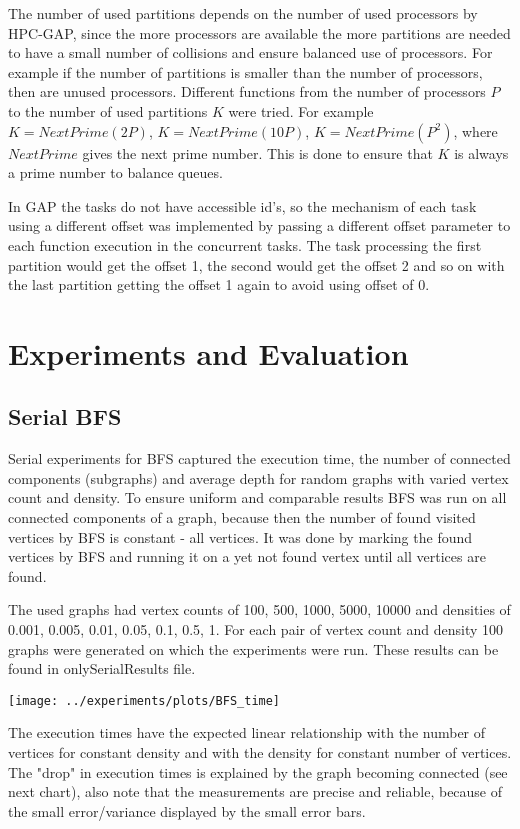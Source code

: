 \documentclass{report}
\theoremstyle{plain}
\theoremstyle{definition}
\theoremstyle{remark}
\begin{document}
The number of used partitions depends on the number of used processors by HPC-GAP, since the more processors are available the more partitions are needed to have a small number of collisions and ensure balanced use of processors. For example if the number of partitions is smaller than the number of processors, then are unused processors. Different functions from the number of processors $P$ to the number of used partitions $K$ were tried. For example $K=NextPrime(2P)$, $K=NextPrime(10P)$, $K=NextPrime(P^2)$, where $NextPrime$ gives the next prime number. This is done to ensure that $K$ is always a prime number to balance queues.

In GAP the tasks do not have accessible id's, so the mechanism of each task using a different offset was implemented by passing a different offset parameter to each function execution in the concurrent tasks. The task processing the first partition would get the offset 1, the second would get the offset 2 and so on with the last partition getting the offset 1 again to avoid using offset of 0.

\section{Experiments and Evaluation}

\subsection{Serial BFS}

Serial experiments for BFS captured the execution time, the number of connected components (subgraphs) and average depth for random graphs with varied vertex count and density. To ensure uniform and comparable results BFS was run on all connected components of a graph, because then the number of found visited vertices by BFS is constant - all vertices. It was done by marking the found vertices by BFS and running it on a yet not found vertex until all vertices are found.

 The used graphs had vertex counts of 100, 500, 1000, 5000, 10000 and densities of 0.001, 0.005, 0.01, 0.05, 0.1, 0.5, 1. For each pair of vertex count and density 100 graphs were generated on which the experiments were run. These results can be found in onlySerialResults file.

\texttt{[image: ../experiments/plots/BFS\_time]}

The execution times have the expected linear relationship with the number of vertices for constant density and with the density for constant number of vertices. The "drop" in execution times is explained by the graph becoming connected (see next chart), also note that the measurements are precise and reliable, because of the small error/variance displayed by the small error bars.
\end{document}
